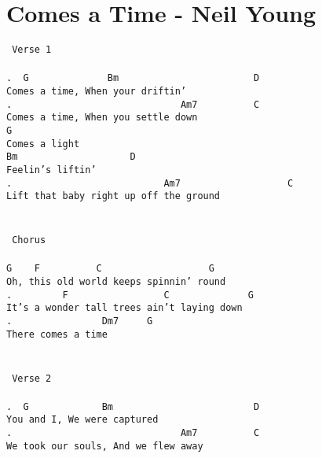 \newpage
\section{Comes a Time - Neil Young}
\label{Comes a Time - Neil Young}
\texttt{\lbrack\ Verse\ 1\rbrack\\
\\
.\ \ G\ \ \ \ \ \ \ \ \ \ \ \ \ \ Bm\ \ \ \ \ \ \ \ \ \ \ \ \ \ \ \ \ \ \ \ \ \ \ \ D\\
Comes\ a\ time,\ When\ your\ driftin'\\
.\ \ \ \ \ \ \ \ \ \ \ \ \ \ \ \ \ \ \ \ \ \ \ \ \ \ \ \ \ \ Am7\ \ \ \ \ \ \ \ \ \ C\\
Comes\ a\ time,\ When\ you\ settle\ down\\
G\\
Comes\ a\ light\\
Bm\ \ \ \ \ \ \ \ \ \ \ \ \ \ \ \ \ \ \ \ D\\
Feelin's\ liftin'\\
.\ \ \ \ \ \ \ \ \ \ \ \ \ \ \ \ \ \ \ \ \ \ \ \ \ \ \ Am7\ \ \ \ \ \ \ \ \ \ \ \ \ \ \ \ \ \ \ C\\
Lift\ that\ baby\ right\ up\ off\ the\ ground\\
\\
\\
\lbrack\ Chorus\rbrack\\
\\
G\ \ \ \ F\ \ \ \ \ \ \ \ \ \ C\ \ \ \ \ \ \ \ \ \ \ \ \ \ \ \ \ \ \ G\\
Oh,\ this\ old\ world\ keeps\ spinnin'\ round\ \\
.\ \ \ \ \ \ \ \ \ F\ \ \ \ \ \ \ \ \ \ \ \ \ \ \ \ \ C\ \ \ \ \ \ \ \ \ \ \ \ \ \ G\\
It's\ a\ wonder\ tall\ trees\ ain't\ laying\ down\\
.\ \ \ \ \ \ \ \ \ \ \ \ \ \ \ \ Dm7\ \ \ \ \ G\\
There\ comes\ a\ time\\
\\
\\
\lbrack\ Verse\ 2\rbrack\\
\\
.\ \ G\ \ \ \ \ \ \ \ \ \ \ \ \ Bm\ \ \ \ \ \ \ \ \ \ \ \ \ \ \ \ \ \ \ \ \ \ \ \ \ D\\
You\ and\ I,\ We\ were\ captured\\
.\ \ \ \ \ \ \ \ \ \ \ \ \ \ \ \ \ \ \ \ \ \ \ \ \ \ \ \ \ \ Am7\ \ \ \ \ \ \ \ \ \ C\\
We\ took\ our\ souls,\ And\ we\ flew\ away\\
}
